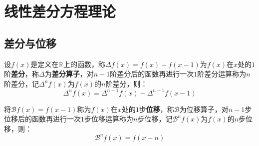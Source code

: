 \section{线性差分方程理论}

\subsection{差分与位移}
\begin{definition}
	设$f(x)$是定义在$\mathbb{R}^{}$上的函数，称$\Delta f(x)=f(x)-f(x-1)$为$f(x)$在$x$处的$1$阶\textbf{差分}，称$\Delta$为\textbf{差分算子}，对$n-1$阶差分后的函数再进行一次$1$阶差分运算称为$n$阶差分，记$\Delta^nf(x)$为$f(x)$的$n$阶差分，则：
	\begin{equation*}
		\Delta^nf(x)=\Delta^{n-1}f(x)-\Delta^{n-1}f(x-1)
	\end{equation*}\par
	将$\mathcal{B}f(x)=f(x-1)$称为$f(x)$在$x$处的$1$步\textbf{位移}，称$\mathcal{B}$为位移算子，对$n-1$步位移后的函数再进行一次$1$步位移运算称为$n$步位移，记$\mathcal{B}^nf(x)$为$f(x)$的$n$步位移，则：
	\begin{equation*}
		\mathcal{B}^nf(x)=f(x-n)
	\end{equation*}
\end{definition}
